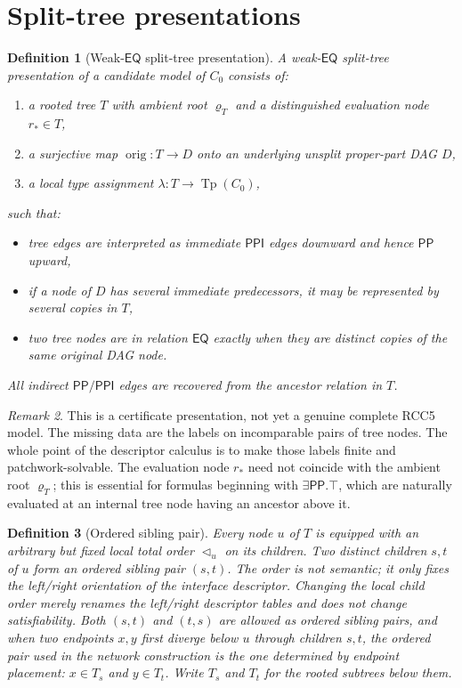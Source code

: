 \documentclass[11pt]{article}
\newtheorem{definition}{Definition}[section]
\theoremstyle{remark}
\newtheorem{remark}[definition]{Remark}
\newcommand{\PP}{\mathsf{PP}}
\newcommand{\PPI}{\mathsf{PPI}}
\newcommand{\EQ}{\mathsf{EQ}}
\newcommand{\Tp}{\operatorname{Tp}}
\newcommand{\orig}{\operatorname{orig}}
\begin{document}
\section{Split-tree presentations}

\begin{definition}[Weak-$\EQ$ split-tree presentation]
A \emph{weak-$\EQ$ split-tree presentation} of a candidate model of $C_0$ consists of:
\begin{enumerate}[label=(\roman*)]
    \item a rooted tree $T$ with ambient root $\varrho_T$ and a distinguished \emph{evaluation node} $r_\ast\in T$,
    \item a surjective map $\orig:T\to D$ onto an underlying unsplit proper-part DAG $D$,
    \item a local type assignment $\lambda:T\to\Tp(C_0)$,
\end{enumerate}
such that:
\begin{itemize}
    \item tree edges are interpreted as immediate $\PPI$ edges downward and hence $\PP$ upward,
    \item if a node of $D$ has several immediate predecessors, it may be represented by several copies in $T$,
    \item two tree nodes are in relation $\EQ$ exactly when they are distinct copies of the same original DAG node.
\end{itemize}
All indirect $\PP/\PPI$ edges are recovered from the ancestor relation in $T$.
\end{definition}

\begin{remark}
This is a certificate presentation, not yet a genuine complete RCC5 model. The missing data are the labels on incomparable pairs of tree nodes. The whole point of the descriptor calculus is to make those labels finite and patchwork-solvable. The evaluation node $r_\ast$ need not coincide with the ambient root $\varrho_T$; this is essential for formulas beginning with $\exists\PP.\top$, which are naturally evaluated at an internal tree node having an ancestor above it.
\end{remark}

\begin{definition}[Ordered sibling pair]\label{def:ordered-siblings}
Every node $u$ of $T$ is equipped with an arbitrary but fixed local total order $\triangleleft_u$ on its children. Two distinct children $s,t$ of $u$ form an \emph{ordered sibling pair} $(s,t)$. The order is not semantic; it only fixes the left/right orientation of the interface descriptor. Changing the local child order merely renames the left/right descriptor tables and does not change satisfiability. Both $(s,t)$ and $(t,s)$ are allowed as ordered sibling pairs, and when two endpoints $x,y$ first diverge below $u$ through children $s,t$, the ordered pair used in the network construction is the one determined by endpoint placement: $x\in T_s$ and $y\in T_t$. Write $T_s$ and $T_t$ for the rooted subtrees below them.
\end{definition}
\end{document}
